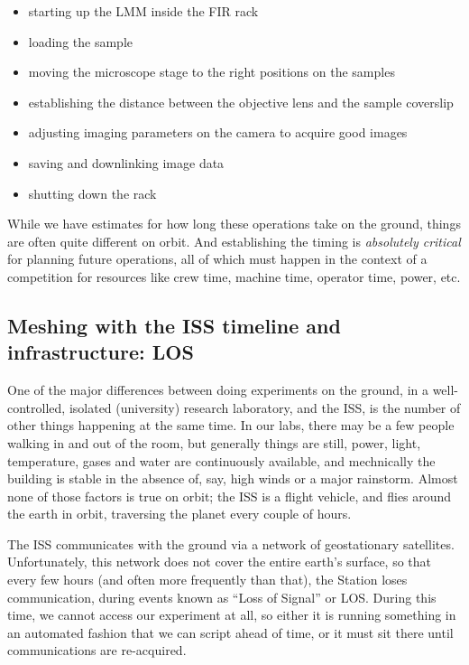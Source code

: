 \begin{itemize}
\item starting up the LMM inside the FIR rack
\item loading the sample
\item moving the microscope stage to the right positions on the samples
\item establishing the distance between the objective lens and the sample coverslip
\item adjusting imaging parameters on the camera to acquire good images
\item saving and downlinking image data
\item shutting down the rack
\end{itemize}

While we have estimates for how long these operations take on the ground, things are often quite different on orbit. And establishing the timing is \emph{absolutely critical} for planning future operations, all of which must happen in the context of a competition for resources like crew time, machine time, operator time, power, etc.

\subsection{Meshing with the ISS timeline and infrastructure: LOS}\hypertarget{meshing-with-the-iss-timeline-and-infrastructure-los}{}\label{meshing-with-the-iss-timeline-and-infrastructure-los}
One of the major differences between doing experiments on the ground, in a
well-controlled, isolated (university) research laboratory, and the ISS, is the
number of other things happening at the same time. In our labs, there may be a
few people walking in and out of the room, but generally things are still,
power, light, temperature, gases and water are continuously available, and
mechnically the building is stable in the absence of, say, high winds or a major
rainstorm. Almost none of those factors is true on orbit; the ISS is a flight
vehicle, and flies around the earth in orbit, traversing the planet every couple
of hours.

The ISS communicates with the ground via a network of geostationary satellites.
Unfortunately, this network does not cover the entire earth's surface, so that
every few hours (and often more frequently than that), the Station loses
communication, during events known as ``Loss of Signal'' or LOS. During this
time, we cannot access our experiment at all, so either it is running something
in an automated fashion that we can script ahead of time, or it must sit there
until communications are re-acquired.

